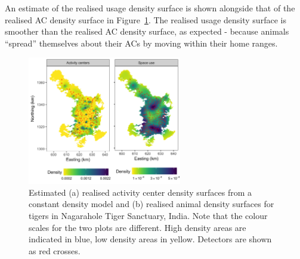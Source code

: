 \documentclass[10pt,a4paper]{article}
\begin{document}
An estimate of the realised usage density surface is shown alongside that of the realised AC density surface  in Figure~\ref{tigerspaceuse}. The realised usage density surface is smoother than the realised AC density surface, as expected - because animals ``spread'' themselves about their ACs by moving within their home ranges. %

\begin{figure}[htbp]
\centering
\includegraphics[width=0.6\textwidth]{tiger_spaceuse.png}
\caption{Estimated (a) realised activity center density surfaces from a constant density model and (b) realised animal density surfaces for tigers in Nagarahole Tiger Sanctuary, India. Note that the colour scales for the two plots are different. High density areas are indicated in blue, low density areas in yellow. Detectors are shown as red crosses.}
\label{tigerspaceuse}
\end{figure}
\end{document}
